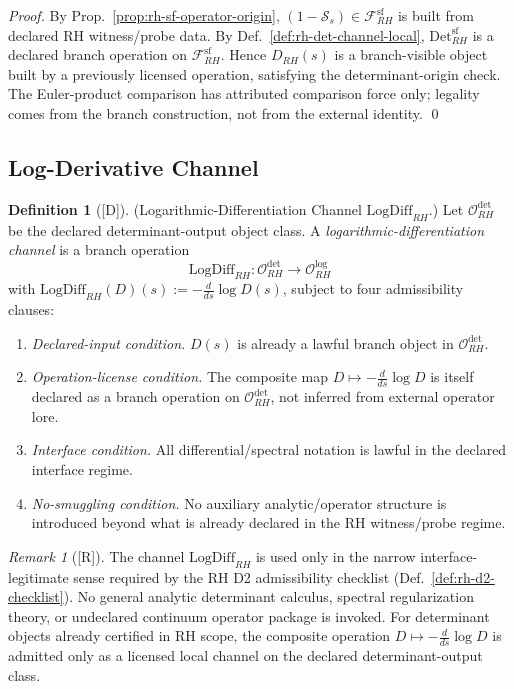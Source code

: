 \documentclass[12pt,oneside]{amsbook}
\theoremstyle{plain}
\theoremstyle{definition}
\newtheorem{definition}[theorem]{Definition}
\theoremstyle{remark}
\newtheorem{remark}[theorem]{Remark}
\newcommand{\status}[1]{\textup{[#1]}}
\begin{document}
\begin{proof}
By Prop.~\ref{prop:rh-sf-operator-origin}, $(1-\mathcal{S}_s) \in
\mathcal{F}_{RH}^{\mathrm{sf}}$ is built from declared RH witness/probe
data. By Def.~\ref{def:rh-det-channel-local}, $\mathrm{Det}_{RH}^{\mathrm{sf}}$
is a declared branch operation on $\mathcal{F}_{RH}^{\mathrm{sf}}$.
Hence $D_{RH}(s)$ is a branch-visible object built by a previously
licensed operation, satisfying the determinant-origin check. The
Euler-product comparison has attributed comparison force only;
legality comes from the branch construction, not from the external
identity. \qed
\end{proof}

\subsection{Log-Derivative Channel}

\begin{definition}[\status{D}]\label{def:rh-logdiff-channel}
\textup{(Logarithmic-Differentiation Channel $\mathrm{LogDiff}_{RH}$.)}
Let $\mathcal{O}_{RH}^{\det}$ be the declared determinant-output
object class. A \emph{logarithmic-differentiation channel} is a
branch operation
\[
 \mathrm{LogDiff}_{RH} :
 \mathcal{O}_{RH}^{\det} \to \mathcal{O}_{RH}^{\log}
\]
with $\mathrm{LogDiff}_{RH}(D)(s) := -\tfrac{d}{ds}\log D(s)$,
subject to four admissibility clauses:
\begin{enumerate}[label=\textup{(\arabic*)}]
 \item \emph{Declared-input condition.} $D(s)$ is already a lawful
 branch object in $\mathcal{O}_{RH}^{\det}$.
 \item \emph{Operation-license condition.} The composite map
 $D \mapsto -\tfrac{d}{ds}\log D$ is itself declared as a branch
 operation on $\mathcal{O}_{RH}^{\det}$, not inferred from
 external operator lore.
 \item \emph{Interface condition.} All differential/spectral
 notation is lawful in the declared interface regime.
 \item \emph{No-smuggling condition.} No auxiliary analytic/operator
 structure is introduced beyond what is already declared in the
 RH witness/probe regime.
\end{enumerate}
\end{definition}

\begin{remark}[\status{R}]\label{rem:rh-logdiff-interface-lawfulness}
The channel $\mathrm{LogDiff}_{RH}$ is used only in the narrow
interface-legitimate sense required by the RH D2 admissibility
checklist (Def.~\ref{def:rh-d2-checklist}). No general analytic
determinant calculus, spectral regularization theory, or undeclared
continuum operator package is invoked. For determinant objects
already certified in RH scope, the composite operation $D \mapsto
-\tfrac{d}{ds}\log D$ is admitted only as a licensed local channel
on the declared determinant-output class.
\end{remark}
\end{document}
